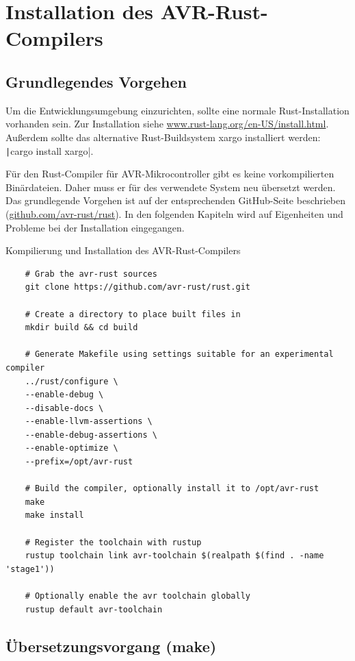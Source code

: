 \documentclass
[ 12pt,
  parskip=half %
]{scrreprt}
\newenvironment{mylisting}[1][H]
{\captionsetup{aboveskip=-0.2\normalbaselineskip}\begin{listing}[#1]}
	{\end{listing}}
\begin{document}
\section{Installation des AVR-Rust-Compilers}

\subsection{Grundlegendes Vorgehen}

Um die Entwicklungsumgebung einzurichten, sollte eine normale Rust-Installation vorhanden sein. Zur Installation siehe \href{https://www.rust-lang.org/en-US/install.html}{www.rust-lang.org/en-US/install.html}. Außerdem sollte das alternative Rust-Buildsystem xargo installiert werden: \texttt|cargo install xargo|.

Für den Rust-Compiler für AVR-Mikrocontroller gibt es keine vorkompilierten Binärdateien. Daher muss er für des verwendete System neu übersetzt werden. Das grundlegende Vorgehen ist auf der entsprechenden GitHub-Seite beschrieben (\href{https://github.com/avr-rust/rust}{github.com/avr-rust/rust}). In den folgenden Kapiteln wird auf Eigenheiten und Probleme bei der Installation eingegangen.

\begin{mylisting}[H]
	\caption{Kompilierung und Installation des AVR-Rust-Compilers  \cite{github-avr-rust}}
	\begin{verbatim}
	# Grab the avr-rust sources
	git clone https://github.com/avr-rust/rust.git
	
	# Create a directory to place built files in
	mkdir build && cd build
	
	# Generate Makefile using settings suitable for an experimental compiler
	../rust/configure \
	--enable-debug \
	--disable-docs \
	--enable-llvm-assertions \
	--enable-debug-assertions \
	--enable-optimize \
	--prefix=/opt/avr-rust
	
	# Build the compiler, optionally install it to /opt/avr-rust
	make
	make install
	
	# Register the toolchain with rustup
	rustup toolchain link avr-toolchain $(realpath $(find . -name 'stage1'))
	
	# Optionally enable the avr toolchain globally
	rustup default avr-toolchain
		\end{verbatim}
\end{mylisting}

\subsection{Übersetzungsvorgang (make)}
\end{document}
